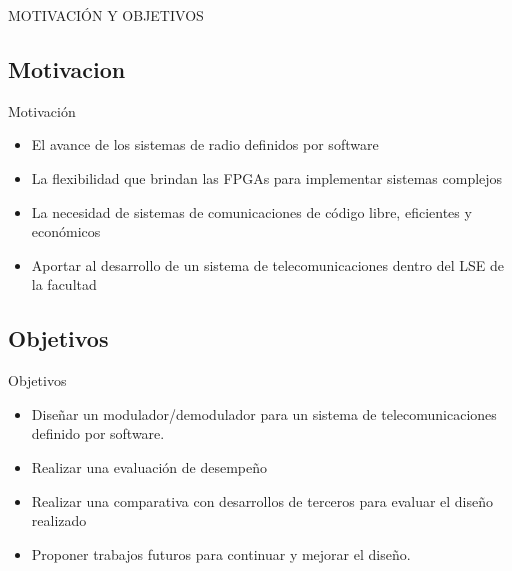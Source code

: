 \begin{frame}
	\begin{center}
	\Huge MOTIVACIÓN Y OBJETIVOS
	\end{center}
\end{frame}

\subsection{Motivacion}

\begin{frame}{Motivación}
  \Fontit
  \begin{itemize}
    \item<1-> El avance de los sistemas de radio definidos por software
    \item<2-> La flexibilidad que brindan las FPGAs para implementar sistemas complejos
    \item<3-> La necesidad de sistemas de comunicaciones de código libre, eficientes y económicos
    \item<4-> Aportar al desarrollo de un sistema de telecomunicaciones dentro del LSE
    de la facultad
  \end{itemize}
\end{frame}

\subsection{Objetivos}
\begin{frame}{Objetivos}
  \Fontit
  \begin{itemize}
    \item<1-> Diseñar un modulador/demodulador para un sistema de telecomunicaciones definido por
    software.
    \item<6-> Realizar una evaluación de desempeño
    \item<11-> Realizar una comparativa con desarrollos de terceros para evaluar el diseño realizado
    \item<12-> Proponer trabajos futuros para continuar y mejorar el diseño.
 \end{itemize}    
\end{frame}
